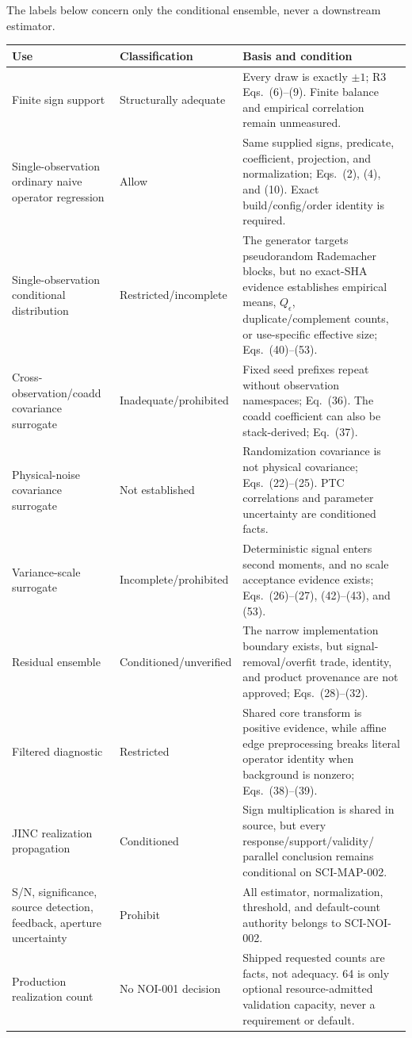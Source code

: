\documentclass[10pt]{article}
\begin{document}
The labels below concern only the conditional ensemble, never a downstream
estimator.

\begin{longtable}{@{}p{}p{}p{}@{}}
\toprule
Use & Classification & Basis and condition \\
\midrule
\endhead
Finite sign support & Structurally adequate &
Every draw is exactly $\pm1$; R3 Eqs.~(6)--(9).  Finite balance and empirical
correlation remain unmeasured. \\
Single-observation ordinary naive operator regression & Allow &
Same supplied signs, predicate, coefficient, projection, and normalization;
Eqs.~(2), (4), and (10).  Exact build/config/order identity is required. \\
Single-observation conditional distribution & Restricted/incomplete &
The generator targets pseudorandom Rademacher blocks, but no exact-SHA evidence
establishes empirical means, $Q_\epsilon$, duplicate/complement counts, or
use-specific effective size; Eqs.~(40)--(53). \\
Cross-observation/coadd covariance surrogate & Inadequate/prohibited &
Fixed seed prefixes repeat without observation namespaces; Eq.~(36).  The
coadd coefficient can also be stack-derived; Eq.~(37). \\
Physical-noise covariance surrogate & Not established &
Randomization covariance is not physical covariance; Eqs.~(22)--(25).
PTC correlations and parameter uncertainty are conditioned facts. \\
Variance-scale surrogate & Incomplete/prohibited &
Deterministic signal enters second moments, and no scale acceptance evidence
exists; Eqs.~(26)--(27), (42)--(43), and (53). \\
Residual ensemble & Conditioned/unverified &
The narrow implementation boundary exists, but signal-removal/overfit trade,
identity, and product provenance are not approved; Eqs.~(28)--(32). \\
Filtered diagnostic & Restricted &
Shared core transform is positive evidence, while affine edge preprocessing
breaks literal operator identity when background is nonzero; Eqs.~(38)--(39). \\
JINC realization propagation & Conditioned &
Sign multiplication is shared in source, but every response/support/validity/
parallel conclusion remains conditional on SCI-MAP-002. \\
S/N, significance, source detection, feedback, aperture uncertainty & Prohibit &
All estimator, normalization, threshold, and default-count authority belongs
to SCI-NOI-002. \\
Production realization count & No NOI-001 decision &
Shipped requested counts are facts, not adequacy.  64 is only optional
resource-admitted validation capacity, never a requirement or default. \\
\bottomrule
\end{longtable}
\end{document}
